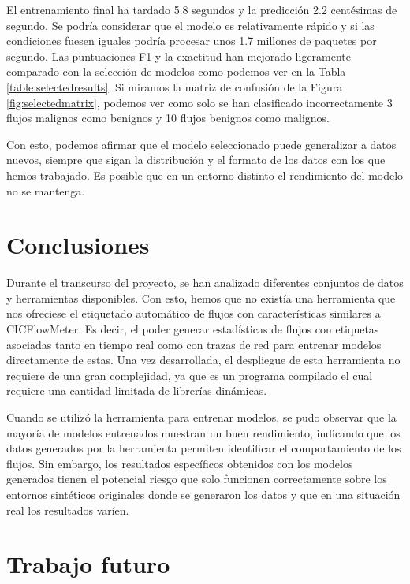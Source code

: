\documentclass[10pt,a4paper,twoside]{article}
\begin{document}
\begin{multicols*}{2}
    El entrenamiento final ha tardado 5.8 segundos y la predicción 2.2 centésimas de segundo. Se podría considerar que el modelo es relativamente rápido y si las condiciones fuesen iguales podría procesar unos 1.7 millones de paquetes por segundo. Las puntuaciones F1 y la exactitud han mejorado ligeramente comparado con la selección de modelos como podemos ver en la Tabla \ref{table:selectedresults}. Si miramos la matriz de confusión de la Figura \ref{fig:selectedmatrix}, podemos ver como solo se han clasificado incorrectamente 3 flujos malignos como benignos y 10 flujos benignos como malignos.

    Con esto, podemos afirmar que el modelo seleccionado puede generalizar a datos nuevos, siempre que sigan la distribución y el formato de los datos con los que hemos trabajado. Es posible que en un entorno distinto el rendimiento del modelo no se mantenga.
    
    \section{Conclusiones} \label{conclusiones}

    Durante el transcurso del proyecto, se han analizado diferentes conjuntos de datos y herramientas disponibles. Con esto, hemos que no existía una herramienta que nos ofreciese el etiquetado automático de flujos con características similares a CICFlowMeter. Es decir, el poder generar estadísticas de flujos con etiquetas asociadas tanto en tiempo real como con trazas de red para entrenar modelos directamente de estas. Una vez desarrollada, el despliegue de esta herramienta no requiere de una gran complejidad, ya que es un programa compilado el cual requiere una cantidad limitada de librerías dinámicas.

    Cuando se utilizó la herramienta para entrenar modelos, se pudo observar que la mayoría de modelos entrenados muestran un buen rendimiento, indicando que los datos generados por la herramienta permiten identificar el comportamiento de los flujos. Sin embargo, los resultados específicos obtenidos con los modelos generados tienen el potencial riesgo que solo funcionen correctamente sobre los entornos sintéticos originales donde se generaron los datos y que en una situación real los resultados varíen.
    
    \section{Trabajo futuro} \label{tabajofuturo}


\end{multicols*}
\end{document}
